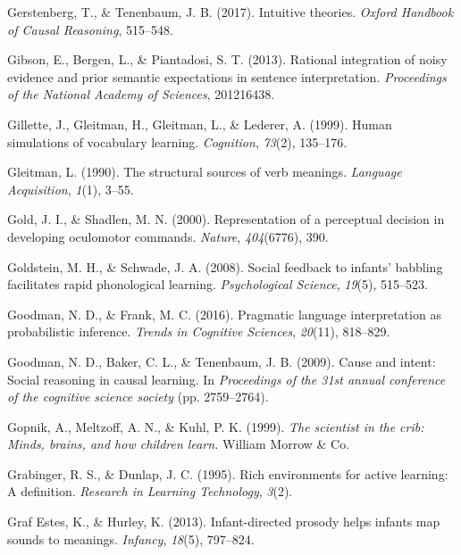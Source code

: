 \documentclass[oneside]{report}
\begin{document}
\hypertarget{ref-gerstenberg2017intuitive}{}
Gerstenberg, T., \& Tenenbaum, J. B. (2017). Intuitive theories.
\emph{Oxford Handbook of Causal Reasoning}, 515--548.

\hypertarget{ref-gibson2013rational}{}
Gibson, E., Bergen, L., \& Piantadosi, S. T. (2013). Rational
integration of noisy evidence and prior semantic expectations in
sentence interpretation. \emph{Proceedings of the National Academy of
Sciences}, 201216438.

\hypertarget{ref-gillette1999human}{}
Gillette, J., Gleitman, H., Gleitman, L., \& Lederer, A. (1999). Human
simulations of vocabulary learning. \emph{Cognition}, \emph{73}(2),
135--176.

\hypertarget{ref-gleitman1990structural}{}
Gleitman, L. (1990). The structural sources of verb meanings.
\emph{Language Acquisition}, \emph{1}(1), 3--55.

\hypertarget{ref-gold2000representation}{}
Gold, J. I., \& Shadlen, M. N. (2000). Representation of a perceptual
decision in developing oculomotor commands. \emph{Nature},
\emph{404}(6776), 390.

\hypertarget{ref-goldstein2008social}{}
Goldstein, M. H., \& Schwade, J. A. (2008). Social feedback to infants'
babbling facilitates rapid phonological learning. \emph{Psychological
Science}, \emph{19}(5), 515--523.

\hypertarget{ref-goodman2016pragmatic}{}
Goodman, N. D., \& Frank, M. C. (2016). Pragmatic language
interpretation as probabilistic inference. \emph{Trends in Cognitive
Sciences}, \emph{20}(11), 818--829.

\hypertarget{ref-goodman2009cause}{}
Goodman, N. D., Baker, C. L., \& Tenenbaum, J. B. (2009). Cause and
intent: Social reasoning in causal learning. In \emph{Proceedings of the
31st annual conference of the cognitive science society} (pp.
2759--2764).

\hypertarget{ref-gopnik1999scientist}{}
Gopnik, A., Meltzoff, A. N., \& Kuhl, P. K. (1999). \emph{The scientist
in the crib: Minds, brains, and how children learn.} William Morrow \&
Co.

\hypertarget{ref-grabinger1995rich}{}
Grabinger, R. S., \& Dunlap, J. C. (1995). Rich environments for active
learning: A definition. \emph{Research in Learning Technology},
\emph{3}(2).

\hypertarget{ref-graf2013infant}{}
Graf Estes, K., \& Hurley, K. (2013). Infant-directed prosody helps
infants map sounds to meanings. \emph{Infancy}, \emph{18}(5), 797--824.
\end{document}
